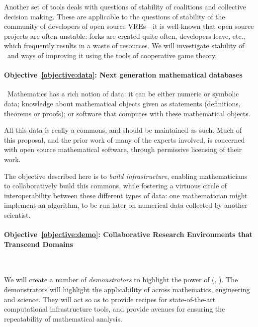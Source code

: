 \documentclass[noworkareas,deliverables,\classoptions]{euproposal}       %
\begin{document}
\begin{proposal}
Another set of tools deals with questions of stability of coalitions and
collective decision making.  These are applicable to the questions of stability of
the community of developers  of open source VREs---it is well-known that 
open source projects are often unstable: forks are created quite often,
developers leave, etc., 
which frequently results in a waste of resources.
We will investigate stability of \TheProject\ and ways of improving it using the  tools
of cooperative game theory. 



\paragraph{Objective~\ref{objective:data}: Next generation mathematical databases}\ 
Mathematics has a rich notion of data: it can be either
numeric or symbolic data; knowledge about mathematical objects given as
statements (definitions, theorems or proofs); or software that computes
with these mathematical objects.

All this data is really a commons, and should be maintained as
such. Much of this proposal, and the prior work of many of the experts
involved, is concerned with open source mathematical software, through
permissive licensing of their work.

The objective described here is to \emph{build infrastructure},
enabling mathematicians to collaboratively build this commons, while
fostering a virtuous circle of interoperability between these different
types of data: one mathematician might implement an algorithm, to be
run later on numerical data collected by another scientist.

\paragraph{Objective~\ref{objective:demo}: Collaborative Research Environments that Transcend Domains}\ 


We will create a number of \emph{demonstrators} to highlight the power
of \TheProject{} (\taskref{UI}{structdocs}, \taskref{}{ibook}). The demonstrators will highlight the applicability
of \TheProject{} across mathematics, engineering and science. They
will act so as to provide recipes for state-of-the-art computational
infrastructure tools, and provide avenues for ensuring the
repeatability of mathematical analysis.


\end{proposal}
\end{document}
